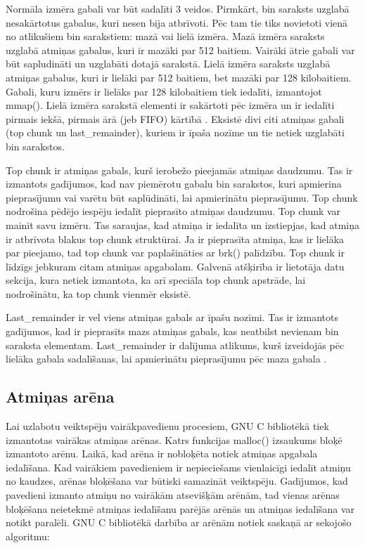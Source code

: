 Normāla izmēra gabali var būt sadalīti 3 veidos. Pirmkārt, bin saraksts uzglabā nesakārtotus gabalus, kuri nesen bija atbrīvoti.  
Pēc tam tie tiks novietoti vienā no atlikušiem bin sarakstiem: mazā vai lielā izmēra. 
Mazā izmēra saraksts uzglabā atmiņas gabalus, kuri ir mazāki par 512 baitiem. 
Vairāki ātrie gabali var būt sapludināti un uzglabāti dotajā sarakstā. 
Lielā izmēra saraksts uzglabā atmiņas gabalus, kuri ir lielāki par 512 baitiem, bet mazāki par 128 kilobaitiem. 
Gabali, kuru izmērs ir lielāks par 128 kilobaitiem tiek iedalīti, izmantojot mmap().
Lielā izmēra sarakstā elementi ir sakārtoti pēc izmēra un ir iedalīti pirmais iekšā, pirmais ārā (jeb FIFO) kārtībā \cite {Binning}. 
Eksistē divi citi atmiņas gabali (top chunk un last\_remainder), kuriem ir īpaša nozīme un tie netiek uzglabāti bin sarakstos. 

Top chunk ir atmiņas gabals, kurš ierobežo pieejamās atmiņas daudzumu.
Tas ir izmantots gadījumos, kad nav piemērotu gabalu bin sarakstos, kuri apmierina pieprasījumu vai varētu būt saplūdināti, lai apmierinātu pieprasījumu.
Top chunk nodrošina pēdējo iespēju iedalīt pieprasīto atmiņas daudzumu.
Top chunk var mainīt savu izmēru. Tas saraujas, kad atmiņa ir iedalīta un izstiepjas, kad atmiņa ir atbrīvota blakus top chunk struktūrai. 
Ja ir pieprasīta atmiņa, kas ir lielāka par pieejamo, tad top chunk var paplašināties ar brk() palīdzību.
Top chunk ir līdzīgs jebkuram citam atmiņas apgabalam. 
Galvenā atšķirība ir lietotāja datu sekcija, kura netiek izmantota, ka arī speciāla top chunk apstrāde, lai nodrošinātu, ka top chunk vienmēr eksistē.

Last\_remainder ir vel viens atmiņas gabals ar īpašu nozīmi.
Tas ir izmantots gadījumos, kad ir pieprasīts mazs atmiņas gabals, kas neatbilst nevienam bin saraksta elementam. 
Last\_remainder ir dalījuma atlikums, kurš izveidojās pēc lielāka gabala sadalīšanas, lai apmierinātu pieprasījumu pēc maza gabala  \cite {BLACKHAT}.

\subsection{Atmiņas arēna}

Lai uzlabotu veiktspēju vairākpavedienu procesiem, GNU C bibliotēkā tiek izmantotas vairākas atmiņas arēnas. 
Katrs funkcijas malloc() izsaukums bloķē izmantoto arēnu. Laikā, kad arēna ir nobloķēta notiek atmiņas apgabala iedalīšana.
Kad vairākiem pavedieniem ir nepieciešams vienlaicīgi iedalīt atmiņu no kaudzes, arēnas bloķēšana var būtiski samazināt veiktspēju.
Gadījumos, kad pavedieni izmanto atmiņu no vairākām atsevišķām arēnām, tad vienas arēnas bloķēšana neietekmē atmiņas iedalīšanu parējās arēnās un atmiņas iedalīšana var notikt paralēli.
GNU C bibliotēkā darbība ar arēnām notiek saskaņā ar sekojošo algoritmu: 

